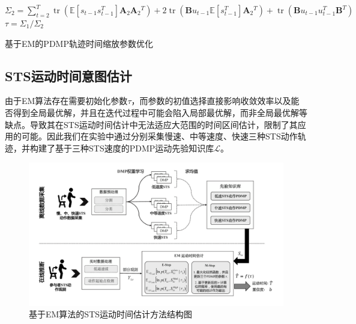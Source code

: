 \begin{algorithm}[h]
{{{            $\Sigma_2=\sum_{t=2}^T \operatorname{tr}\left(\mathbb{E}\left[s_{t-1} s_{t-1}^T\right] \mathbf{A}_2 \mathbf{A}_2{ }^T\right)+2 \operatorname{tr}\left(\mathbf{B} u_{t-1} \mathbb{E}\left[s_{t-1}^T\right] \mathbf{A}_2{ }^T\right)+\operatorname{tr}\left(\mathbf{B} u_{t-1} u_{t-1}^T \mathbf{B}^T\right)$
        }
        $\tau=\Sigma_1 / \Sigma_2$ \;
      }
    }
    \caption{基于EM的PDMP轨迹时间缩放参数优化}
    \label{algo:4-1}
  \end{algorithm}

\subsection{STS运动时间意图估计}
由于EM算法存在需要初始化参数$\tau$，而参数的初值选择直接影响收敛效率以及能否得到全局最优解，并且在迭代过程中可能会陷入局部最优解，而非全局最优解等缺点。导致其在STS运动时间估计中无法适应大范围的时间区间估计，限制了其应用的可能。因此我们在实验中通过分别采集慢速、中等速度、快速三种STS动作轨迹，并构建了基于三种STS速度的PDMP运动先验知识库$\mathscr{L}$。

\begin{figure}[htb]
    \centering\includegraphics[width=1\textwidth]{figures/4-Fig-3.pdf}
    \caption{基于EM算法的STS运动时间估计方法结构图}
    \label{fig:4-3}
\end{figure}

